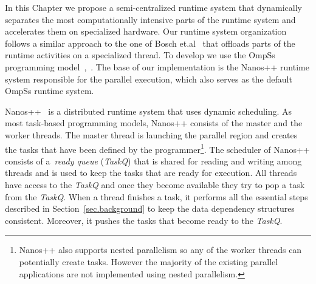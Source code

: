 

In this Chapter we propose a semi-centralized runtime system that dynamically separates the most computationally intensive parts of the runtime system and accelerates them on specialized hardware. 
Our runtime system organization follows a similar approach to the one of Bosch et.al~\cite{DAST,JaumeMaster} that offloads parts of the runtime activities on a specialized thread.
%
To develop {\proposal} we use the OmpSs programming model~\cite{OmpSs},~\cite{OmpSs_PPL11}.
The base of our implementation is the Nanos++ runtime system responsible for the parallel execution, which also serves as the default OmpSs runtime system.

Nanos++~\cite{nanos} is a distributed runtime system that uses dynamic scheduling.
As most task-based programming models, Nanos++ consists of the master and the worker threads.
The master thread is launching the parallel region and creates the tasks that have been defined by the programmer{\footnote{Nanos++ also supports nested parallelism so any of the worker threads can potentially create tasks. However the majority of the existing parallel applications are not implemented using nested parallelism.}}.
The scheduler of Nanos++ consists of a~\textit{ready queue} (\textit{TaskQ}) that is shared for reading and writing among threads and is used to keep the tasks that are ready for execution.
All threads have access to the \textit{TaskQ} and once they become available they try to pop a task from the \textit{TaskQ}.
When a thread finishes a task, it performs all the essential steps described in Section~\ref{sec.background} to keep the data dependency structures consistent.
Moreover, it pushes the tasks that become ready to the \textit{TaskQ}.

